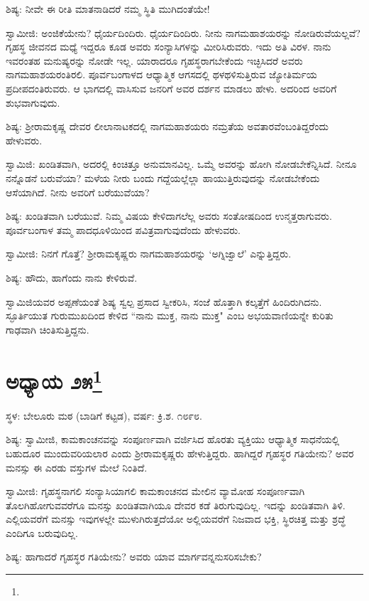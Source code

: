 ಶಿಷ್ಯ: ನೀವೇ ಈ ರೀತಿ ಮಾತನಾಡಿದರೆ ನಮ್ಮ ಸ್ಥಿತಿ ಮುಗಿದಂತೆಯೇ!

ಸ್ವಾಮೀಜಿ: ಅಂಜಿಕೆಯೇನು? ಧೈರ್ಯದಿಂದಿರು. ಧೈರ್ಯದಿಂದಿರು. ನೀನು ನಾಗಮಹಾಶಯರನ್ನು ನೋಡಿರುವೆಯಲ್ಲವೆ? ಗೃಹಸ್ಥ ಜೀವನದ ಮಧ್ಯೆ ಇದ್ದರೂ ಕೂಡ ಅವರು ಸಂನ್ಯಾಸಿಗಳನ್ನು ಮೀರಿಸಿರುವರು. ಇದು ಅತಿ ವಿರಳ. ನಾನು ಇವರಂತಹ ಮನುಷ್ಯರನ್ನು ನೋಡೇ ಇಲ್ಲ. ಯಾರಾದರೂ ಗೃಹಸ್ಥರಾಗಬೇಕೆಂದು ಇಚ್ಛಿಸಿದರೆ ಅವರು ನಾಗಮಹಾಶಯರಂತಿರಲಿ. ಪೂರ್ವಬಂಗಾಳದ ಆಧ್ಯಾತ್ಮಿಕ ಆಗಸದಲ್ಲಿ ಥಳಥಳಿಸುತ್ತಿರುವ ಜ್ಯೋತಿರ್ಮಯ ಪ್ರದೀಪದಂತಿರುವರು. ಆ ಭಾಗದಲ್ಲಿ ವಾಸಿಸುವ ಜನರಿಗೆ ಅವರ ದರ್ಶನ ಮಾಡಲು ಹೇಳು. ಅದರಿಂದ ಅವರಿಗೆ ಶುಭವಾಗುವುದು.

ಶಿಷ್ಯ: ಶ‍್ರೀರಾಮಕೃಷ್ಣ ದೇವರ ಲೀಲಾನಾಟಕದಲ್ಲಿ ನಾಗಮಹಾಶಯರು ನಮ್ರತೆಯ ಅವತಾರವೆಂಬಂತಿದ್ದರೆಂದು ಹೇಳುವರು.

ಸ್ವಾಮಿಜಿ: ಖಂಡಿತವಾಗಿ, ಅದರಲ್ಲಿ ಕಿಂಚಿತ್ತೂ ಅನುಮಾನವಿಲ್ಲ. ಒಮ್ಮೆ ಅವರನ್ನು ಹೋಗಿ ನೋಡಬೇಕೆನ್ನಿಸಿದೆ. ನೀನೂ ನನ್ನೊಡನೆ ಬರುವೆಯಾ? ಮಳೆಯ ನೀರು ಬಂದು ಗದ್ದೆಯಲ್ಲೆಲ್ಲಾ ಹಾಯುತ್ತಿರುವುದನ್ನು ನೋಡಬೇಕೆಂದು ಆಸೆಯಾಗಿದೆ. ನೀನು ಅವರಿಗೆ ಬರೆಯುವೆಯಾ?

ಶಿಷ್ಯ: ಖಂಡಿತವಾಗಿ ಬರೆಯುವೆ. ನಿಮ್ಮ ವಿಷಯ ಕೇಳಿದಾಗಲೆಲ್ಲ ಅವರು ಸಂತೋಷದಿಂದ ಉನ್ಮತ್ತರಾಗುವರು. ಪೂರ್ವಬಂಗಾಳ ತಮ್ಮ ಪಾದಧೂಳಿಯಿಂದ ಪವಿತ್ರವಾಗುವುದೆಂದು ಹೇಳುವರು.

ಸ್ವಾಮೀಜಿ: ನಿನಗೆ ಗೊತ್ತೆ? ಶ‍್ರೀರಾಮಕೃಷ್ಣರು ನಾಗಮಹಾಶಯರನ್ನು ‘ಅಗ್ನಿಜ್ವಾಲೆ’ ಎನ್ನುತ್ತಿದ್ದರು.

ಶಿಷ್ಯ: ಹೌದು, ಹಾಗೆಂದು ನಾನು ಕೇಳಿರುವೆ.

ಸ್ವಾಮಿಜಿಯವರ ಅಪ್ಪಣೆಯಂತೆ ಶಿಷ್ಯ ಸ್ವಲ್ಪ ಪ್ರಸಾದ ಸ್ವೀಕರಿಸಿ, ಸಂಜೆ ಹೊತ್ತಾಗಿ ಕಲ್ಕತ್ತೆಗೆ ಹಿಂದಿರುಗಿದನು. ಸ್ಫೂರ್ತಿಯುತ ಗುರುಮುಖದಿಂದ ಕೇಳಿದ “ನಾನು ಮುಕ್ತ, ನಾನು ಮುಕ್ತ" ಎಂಬ ಅಭಯವಾಣಿಯನ್ನೇ ಕುರಿತು ಗಾಢವಾಗಿ ಚಿಂತಿಸುತ್ತಿದ್ದನು.

\newpage

\chapter[ಅಧ್ಯಾಯ ೨೫]{ಅಧ್ಯಾಯ ೨೫\protect\footnote{}}

\centerline{ಸ್ಥಳ: ಬೇಲೂರು ಮಠ (ಬಾಡಿಗೆ ಕಟ್ಟಡ), ವರ್ಷ: ಕ್ರಿ.ಶ. ೧೮೯೮.}

ಶಿಷ್ಯ: ಸ್ವಾಮೀಜಿ, ಕಾಮಕಾಂಚನವನ್ನು ಸಂಪೂರ್ಣವಾಗಿ ವರ್ಜಿಸಿದ ಹೊರತು ವ್ಯಕ್ತಿಯು ಆಧ್ಯಾತ್ಮಿಕ ಸಾಧನೆಯಲ್ಲಿ ಬಹುದೂರ ಮುಂದುವರಿಯಲಾರ ಎಂದು ಶ‍್ರೀರಾಮಕೃಷ್ಣರು ಹೇಳುತ್ತಿದ್ದರು. ಹಾಗಿದ್ದರೆ ಗೃಹಸ್ಥರ ಗತಿಯೇನು? ಅವರ ಮನಸ್ಸು ಈ ಎರಡು ವಸ್ತುಗಳ ಮೇಲೆ ನಿಂತಿದೆ.

ಸ್ವಾಮೀಜಿ: ಗೃಹಸ್ಥನಾಗಲಿ ಸಂನ್ಯಾಸಿಯಾಗಲಿ ಕಾಮಕಾಂಚನದ ಮೇಲಿನ ವ್ಯಾಮೋಹ ಸಂಪೂರ್ಣವಾಗಿ ತೊಲಗಿಹೋಗುವವರೆಗೂ ಮನಸ್ಸು ಖಂಡಿತವಾಗಿಯೂ ದೇವರ ಕಡೆ ತಿರುಗುವುದಿಲ್ಲ. ಇದನ್ನು ಖಂಡಿತವಾಗಿ ತಿಳಿ. ಎಲ್ಲಿಯವರೆಗೆ ಮನಸ್ಸು ಇವುಗಳಲ್ಲೇ ಮುಳುಗಿರುತ್ತದೆಯೋ ಅಲ್ಲಿಯವರೆಗೆ ನಿಜವಾದ ಭಕ್ತಿ, ಸ್ಥಿರಚಿತ್ತ ಮತ್ತು ಶ್ರದ್ಧೆ ಎಂದಿಗೂ ಬರುವುದಿಲ್ಲ.

ಶಿಷ್ಯ: ಹಾಗಾದರೆ ಗೃಹಸ್ಥರ ಗತಿಯೇನು? ಅವರು ಯಾವ ಮಾರ್ಗವನ್ನನುಸರಿಸಬೇಕು?

